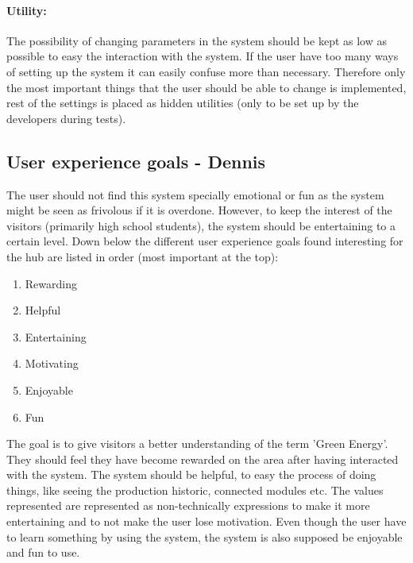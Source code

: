 \paragraph{Utility:}
The possibility of changing parameters in the system should be kept as low as possible to easy the interaction with the system. If the user have too many ways of setting up the system it can easily confuse more than necessary. Therefore only the most important things that the user should be able to change is implemented, rest of the settings is placed as hidden utilities (only to be set up by the developers during tests). 
\subsection{User experience goals - Dennis}
The user should not find this system specially emotional or fun as the system might be seen as frivolous if it is overdone. However, to keep the interest of the visitors (primarily high school students), the system should be entertaining to a certain level.  
Down below the different user experience goals found interesting for the hub are listed in order (most important at the top):
\begin{enumerate}
	\item Rewarding
	\item Helpful
	\item Entertaining
	\item Motivating
	\item Enjoyable
	\item Fun
\end{enumerate}
The goal is to give visitors a better understanding of the term 'Green Energy'. They should feel they have become rewarded on the area after having interacted with the system. The system should be helpful, to easy the process of doing things, like seeing the production historic, connected modules etc. The values represented are represented as non-technically expressions to make it more entertaining and to not make the user lose motivation. Even though the user have to learn something by using the system, the system is also supposed be enjoyable and fun to use.
